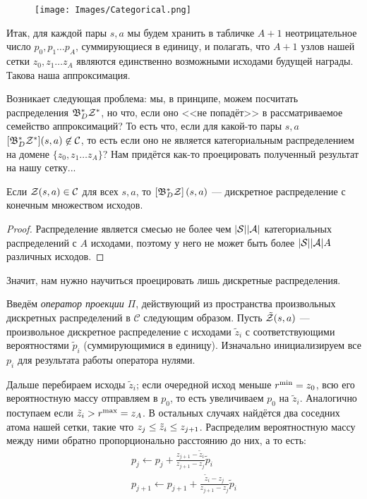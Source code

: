 \begin{figure}
\vspace{-0.3cm}
\centering
\texttt{[image: Images/Categorical.png]}
\vspace{-0.6cm}
\end{figure}
Итак, для каждой пары $s, a$ мы будем хранить в табличке $A + 1$ неотрицательное число $p_0, p_1 \dots p_A$, суммирующиеся в единицу, и полагать, что $A+1$ узлов нашей сетки $z_0, z_1 \dots z_A$ являются единственно возможными исходами будущей награды. Такова наша аппроксимация.

 Возникает следующая проблема: мы, в принципе, можем посчитать распределения $\mathfrak{B}^*_D \mathcal{Z}^*$, но что, если оно <<не попадёт>> в рассматриваемое семейство аппроксимаций? То есть что, если для какой-то пары $s, a$ $[\mathfrak{B}^*_D \mathcal{Z}^*](s, a) \not\in \mathcal{C}$, то есть если оно не является категориальным распределением на домене $\{z_0, z_1 \dots z_A\}$? Нам придётся как-то проецировать полученный результат на нашу сетку...
 
 \begin{proposition}
 Если $\mathcal{Z}(s, a) \in \mathcal{C}$ для всех $s, a$, то $\left[\mathfrak{B}^*_D \mathcal{Z}\right](s, a)$ --- дискретное распределение с конечным множеством исходов.
 \begin{proof} Распределение является смесью не более чем $|\mathcal{S}| |\mathcal{A}|$ категориальных распределений с $A$ исходами, поэтому у него не может быть более $|\mathcal{S}| |\mathcal{A}| A$ различных исходов.
 \end{proof}
 \end{proposition}
 
 Значит, нам нужно научиться проецировать лишь дискретные распределения.
 
 \begin{definition}
 Введём \emph{оператор проекции} $\Pi$, действующий из пространства произвольных дискретных распределений в $\mathcal{C}$ следующим образом. Пусть $\tilde{\mathcal{Z}}(s, a)$ --- произвольное дискретное распределение с исходами $\tilde{z}_i$ с соответствующими вероятностями $\tilde{p}_i$ (суммирующимися в единицу). Изначально инициализируем все $p_i$ для результата работы оператора нулями.
 
 Дальше перебираем исходы $\tilde{z}_i$; если очередной исход меньше $r^{\min} \HM= z_0$, всю его вероятностную массу отправляем в $p_0$, то есть увеличиваем $p_0$ на $\tilde{z}_i$. Аналогично поступаем если $\tilde{z}_i \HM> r^{\max} = z_A$. В остальных случаях найдётся два соседних атома нашей сетки, такие что $z_j \HM\le \tilde{z}_i \HM\le z_{j+1}$. Распределим вероятностную массу между ними обратно пропорционально расстоянию до них, а то есть:
\begin{equation}\label{projector}
\begin{split} 
p_j \leftarrow p_j + \frac{z_{j+1} - \tilde{z}_i}{z_{j+1} - z_j} \tilde{p}_i  \\
p_{j+1} \leftarrow p_{j+1} + \frac{\tilde{z}_i - z_j}{z_{j+1} - z_j} \tilde{p}_i
\end{split}
\end{equation}
 \end{definition}

